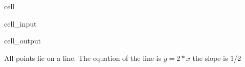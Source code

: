 \documentclass[letterpaper,10pt,english]{jupyterBook}
\begin{document}
\begin{sphinxuseclass}{cell}\begin{sphinxVerbatimInput}

\begin{sphinxuseclass}{cell_input}
\begin{sphinxVerbatim}[commandchars=\\\{\}]
\end{sphinxVerbatim}

\end{sphinxuseclass}\end{sphinxVerbatimInput}
\begin{sphinxVerbatimOutput}

\begin{sphinxuseclass}{cell_output}
\noindent{}

\end{sphinxuseclass}\end{sphinxVerbatimOutput}

\end{sphinxuseclass}
\sphinxAtStartPar
All points lie on a line. The equation of the line is \(y = 2*x\) the slope is 1/2
\end{document}
